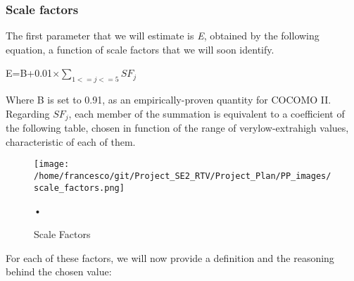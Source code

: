 \documentclass[10pt, a4paper,titlepage]{article}
\begin{document}
\subsubsection{Scale factors}
The first parameter that we will estimate is \emph{E}, obtained by the following equation, a function of scale factors that we will soon identify.
\begin{center}
E=B+0.01$\times\sum_{1<=j<=5}SF_j$
\end{center}
Where B is set to 0.91, as an empirically-proven quantity for COCOMO II.
Regarding $SF_j$, each member of the summation is equivalent to a coefficient of the following table, chosen in function of the range of verylow-extrahigh values, characteristic of each of them.
\begin{figure}[h]
\begin{center}
\texttt{[image: /home/francesco/git/Project\_SE2\_RTV/Project\_Plan/PP\_images/scale\_factors.png]}
\caption{Scale Factors}
\label{fig:scale}
\end{center}•
\end{figure}
\pagebreak
\linebreak
For each of these factors, we will now provide a definition and the reasoning behind the chosen value:
\end{document}
